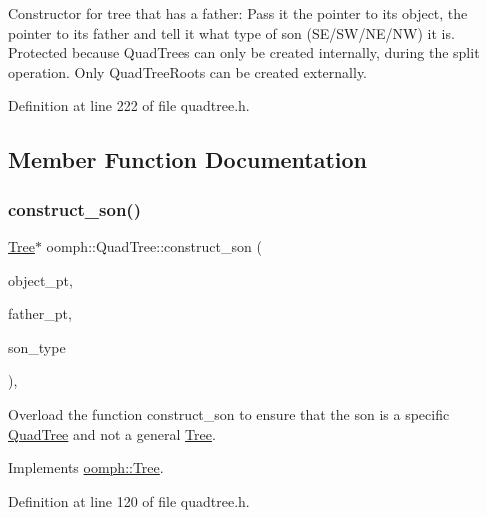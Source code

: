 Constructor for tree that has a father\+: Pass it the pointer to its object, the pointer to its father and tell it what type of son (S\+E/\+S\+W/\+N\+E/\+NW) it is. Protected because Quad\+Trees can only be created internally, during the split operation. Only Quad\+Tree\+Roots can be created externally. 



Definition at line 222 of file quadtree.\+h.



\subsection{Member Function Documentation}
\mbox{\label{classoomph_1_1QuadTree_aa05756df125b508ca55f30cf4c4a11e9}} 
\subsubsection{\texorpdfstring{construct\+\_\+son()}{construct\_son()}}
{\footnotesize\ttfamily \hyperlink{classoomph_1_1Tree}{Tree}$\ast$ oomph\+::\+Quad\+Tree\+::construct\+\_\+son (\begin{DoxyParamCaption}\item[{\hyperlink{classoomph_1_1RefineableElement}{Refineable\+Element} $\ast$const \&}]{object\+\_\+pt,  }\item[{\hyperlink{classoomph_1_1Tree}{Tree} $\ast$const \&}]{father\+\_\+pt,  }\item[{const int \&}]{son\+\_\+type }\end{DoxyParamCaption})\hspace{0.3cm}{\ttfamily [inline]}, {\ttfamily [virtual]}}



Overload the function construct\+\_\+son to ensure that the son is a specific \hyperlink{classoomph_1_1QuadTree}{Quad\+Tree} and not a general \hyperlink{classoomph_1_1Tree}{Tree}. 



Implements \hyperlink{classoomph_1_1Tree_a5eb29718044b1bc56403ee9bd15a60b6}{oomph\+::\+Tree}.



Definition at line 120 of file quadtree.\+h.



